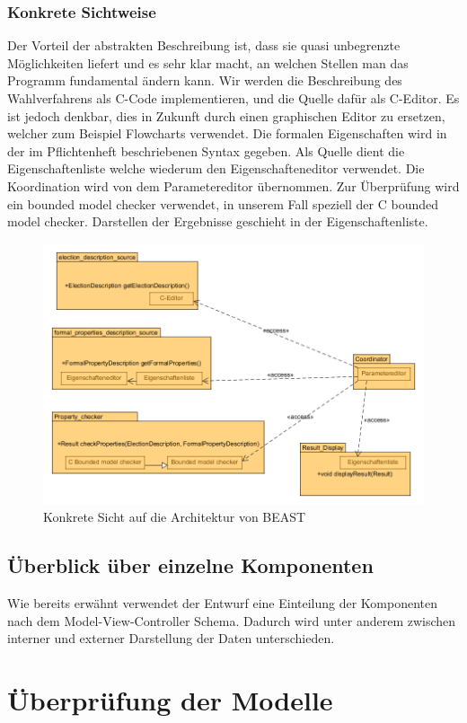 \documentclass[a4paper]{scrreprt}
\begin{document}
\subsection{Konkrete Sichtweise}
Der Vorteil der abstrakten Beschreibung ist, dass sie quasi unbegrenzte Möglichkeiten liefert und es sehr klar macht, an welchen Stellen man das Programm fundamental ändern kann. Wir werden die Beschreibung des Wahlverfahrens als C-Code implementieren, und die Quelle dafür als C-Editor. Es ist jedoch denkbar, dies in Zukunft durch einen graphischen Editor zu ersetzen, welcher zum Beispiel Flowcharts verwendet. Die formalen Eigenschaften wird in der im Pflichtenheft beschriebenen Syntax gegeben. Als Quelle dient die Eigenschaftenliste welche wiederum den Eigenschafteneditor verwendet. Die Koordination wird von dem Parametereditor übernommen. Zur Überprüfung wird ein bounded model checker verwendet, in unserem Fall speziell der C bounded model checker. Darstellen der Ergebnisse geschieht in der Eigenschaftenliste.  

\begin{figure}[H]
\includegraphics[scale=0.5]{highest-level-concrete-view.png}
\caption{Konkrete Sicht auf die Architektur von BEAST}
\label{concrete_view_of_beast_architecture}
\end{figure}

\section{Überblick über einzelne Komponenten}
Wie bereits erwähnt verwendet der Entwurf eine Einteilung der Komponenten nach dem Model-View-Controller Schema. Dadurch wird unter anderem zwischen interner und externer Darstellung der Daten unterschieden. 

\chapter{Überprüfung der Modelle}
\end{document}
